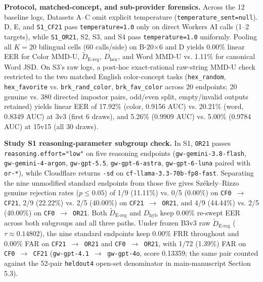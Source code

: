 \documentclass[10pt,letterpaper]{article}
\theoremstyle{definition}
\newcommand{\Dhex}{D_{\mathrm{hex}}}
\newcommand{\Dereg}{\tilde D_{\mathrm{E\mbox{-}reg}}}
\newcommand{\Dhyb}{D_{\mathrm{hyb}}}
\begin{document}
\textbf{Protocol, matched-concept, and sub-provider forensics.} Across the 12 baseline logs, Datasets A--C omit explicit temperature (\texttt{temperature\_\allowbreak{}sent=\allowbreak{}null}). D, E, and \texttt{S1\_\allowbreak{}CF21} pass \texttt{temperature=\allowbreak{}1.\allowbreak{}0} only on direct Workers AI calls (1--2 targets), while \texttt{S1\_\allowbreak{}OR21}, S2, S3, and S4 pass \texttt{temperature=\allowbreak{}1.\allowbreak{}0} uniformly. Pooling all $K=20$ bilingual cells (60 calls/side) on B-20\ensuremath{\times}6 and D yields 0.00\% linear EER for Color MMD-U, $\Dereg{}$, $\Dhex{}$, and Word MMD-U vs. 1.11\% for canonical Word JSD. On S3's raw logs, a post-hoc exact-rational raw-string MMD-U check restricted to the two matched English color-concept tasks (\texttt{hex\_\allowbreak{}random}, \texttt{hex\_\allowbreak{}favorite} vs. \texttt{brk\_\allowbreak{}rand\_\allowbreak{}color}, \texttt{brk\_\allowbreak{}fav\_\allowbreak{}color} across 20 endpoints; 20 genuine vs. 380 directed impostor pairs, odd/even split, empty/invalid outputs retained) yields linear EER of 17.92\% (color, 0.9156 AUC) vs. 20.21\% (word, 0.8349 AUC) at 3v3 (first 6 draws), and 5.26\% (0.9909 AUC) vs. 5.00\% (0.9784 AUC) at 15v15 (all 30 draws).


\textbf{Study S1 reasoning-parameter subgroup check.} In S1, \texttt{OR21} passes \texttt{reasoning.\allowbreak{}effort=\allowbreak{}"low"} on five reasoning endpoints (\texttt{gw-\allowbreak{}gemini-\allowbreak{}3.\allowbreak{}8-\allowbreak{}flash}, \texttt{gw-\allowbreak{}gemini-\allowbreak{}4-\allowbreak{}argon}, \texttt{gw-\allowbreak{}gpt-\allowbreak{}5.\allowbreak{}5}, \texttt{gw-\allowbreak{}gpt-\allowbreak{}6-\allowbreak{}astra}, \texttt{gw-\allowbreak{}gpt-\allowbreak{}6-\allowbreak{}luna} paired with \texttt{or-\allowbreak{}*}), while Cloudflare returns \texttt{-\allowbreak{}sd} on \texttt{cf-\allowbreak{}llama-\allowbreak{}3.\allowbreak{}3-\allowbreak{}70b-\allowbreak{}fp8-\allowbreak{}fast}. Separating the nine unmodified standard endpoints from those five gives Sz\'{e}kely--Rizzo genuine rejection rates ($p \le 0.05$) of 1/9 (11.11\%) vs. 0/5 (0.00\%) on \texttt{CF0 \ensuremath{\rightarrow} CF21}, 2/9 (22.22\%) vs. 2/5 (40.00\%) on \texttt{CF21 \ensuremath{\rightarrow} OR21}, and 4/9 (44.44\%) vs. 2/5 (40.00\%) on \texttt{CF0 \ensuremath{\rightarrow} OR21}. Both $\Dereg{}$ and $\Dhyb{}$ keep 0.00\% re-swept EER across both subgroups and all three paths. Under frozen B3v3 raw $\Dereg{}$ ($\tau \approx 0.14802$), the nine standard endpoints keep 0.00\% FRR throughout and 0.00\% FAR on \texttt{CF21 \ensuremath{\rightarrow} OR21} and \texttt{CF0 \ensuremath{\rightarrow} OR21}, with 1/72 (1.39\%) FAR on \texttt{CF0 \ensuremath{\rightarrow} CF21} (\texttt{gw-\allowbreak{}gpt-\allowbreak{}4.\allowbreak{}1 \ensuremath{\rightarrow} gw-\allowbreak{}gpt-\allowbreak{}4o}, score 0.13359; the same pair counted against the 52-pair \texttt{heldout4} open-set denominator in main-manuscript Section 5.3).
\end{document}
